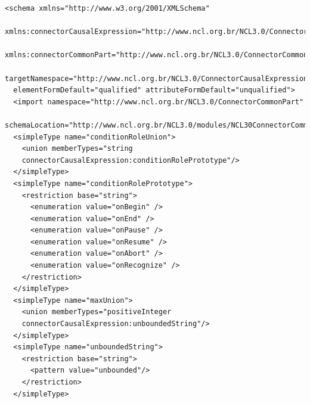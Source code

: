 \documentclass[
  doutorado,
  american
]{ThesisPUC}
\begin{document}
\begin{listing}[t]
\begin{verbatim}
<schema xmlns="http://www.w3.org/2001/XMLSchema"      
  xmlns:connectorCausalExpression="http://www.ncl.org.br/NCL3.0/ConnectorCausalExpression"
  xmlns:connectorCommonPart="http://www.ncl.org.br/NCL3.0/ConnectorCommonPart"
  targetNamespace="http://www.ncl.org.br/NCL3.0/ConnectorCausalExpression"
  elementFormDefault="qualified" attributeFormDefault="unqualified">
  <import namespace="http://www.ncl.org.br/NCL3.0/ConnectorCommonPart"
  schemaLocation="http://www.ncl.org.br/NCL3.0/modules/NCL30ConnectorCommonPart.xsd"/>
  <simpleType name="conditionRoleUnion">
    <union memberTypes="string
    connectorCausalExpression:conditionRolePrototype"/>
  </simpleType>
  <simpleType name="conditionRolePrototype">
    <restriction base="string">
      <enumeration value="onBegin" />
      <enumeration value="onEnd" />
      <enumeration value="onPause" />
      <enumeration value="onResume" />
      <enumeration value="onAbort" />
      <enumeration value="onRecognize" />
    </restriction>
  </simpleType>
  <simpleType name="maxUnion">
    <union memberTypes="positiveInteger
    connectorCausalExpression:unboundedString"/>
  </simpleType>
  <simpleType name="unboundedString">
    <restriction base="string">
      <pattern value="unbounded"/>
    </restriction>
  </simpleType>
\end{verbatim}
\end{listing}
\end{document}
